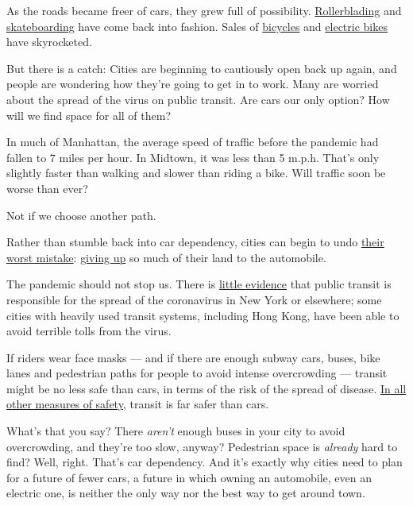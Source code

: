 As the roads became freer of cars, they grew full of possibility.
\href{https://www.ktvu.com/news/rollerskaters-rejoice-throwback-activity-has-revival-during-pandemic}{Rollerblading}
and
\href{https://shop-eat-surf.com/2020/03/skateboard-sales-jump-during-crisis/}{skateboarding}
have come back into fashion. Sales of
\href{https://www.nytimes.com/2020/05/18/nyregion/bike-shortage-coronavirus.html}{bicycles}
and
\href{https://electrek.co/2020/05/01/electric-bike-sales-skyrocket-during-lockdown/}{electric
bikes} have skyrocketed.

But there is a catch: Cities are beginning to cautiously open back up
again, and people are wondering how they're going to get in to work.
Many are worried about the spread of the virus on public transit. Are
cars our only option? How will we find space for all of them?

In much of Manhattan, the average speed of traffic before the pandemic
had fallen to 7 miles per hour. In Midtown, it was less than 5 m.p.h.
That's only slightly faster than walking and slower than riding a bike.
Will traffic soon be worse than ever?

Not if we choose another path.

Rather than stumble back into car dependency, cities can begin to undo
\href{https://www.washingtonpost.com/news/in-theory/wp/2016/02/29/the-car-century-was-a-mistake-its-time-to-move-on/}{their
worst mistake}:
\href{https://www.newyorker.com/magazine/2019/07/29/was-the-automotive-era-a-terrible-mistake}{giving
up} so much of their land to the automobile.

The pandemic should not stop us. There is
\href{https://www.theatlantic.com/ideas/archive/2020/06/fear-transit-bad-cities/612979/}{little
evidence} that public transit is responsible for the spread of the
coronavirus in New York or elsewhere; some cities with heavily used
transit systems, including Hong Kong, have been able to avoid terrible
tolls from the virus.

If riders wear face masks --- and if there are enough subway cars,
buses, bike lanes and pedestrian paths for people to avoid intense
overcrowding --- transit might be no less safe than cars, in terms of
the risk of the spread of disease.
\href{https://mobilitylab.org/2016/09/08/transit-10-times-safer-driving-makes-communities-safer-says-new-apta-report/}{In
all other measures of safety,} transit is far safer than cars.

What's that you say? There \emph{aren't} enough buses in your city to
avoid overcrowding, and they're too slow, anyway? Pedestrian space is
\emph{already} hard to find? Well, right. That's car dependency. And
it's exactly why cities need to plan for a future of fewer cars, a
future in which owning an automobile, even an electric one, is neither
the only way nor the best way to get around town.


